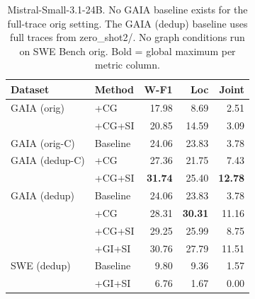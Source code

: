 \begin{table}[h]
\centering\small
\begin{tabular}{ll rrr}
\toprule
\textbf{Dataset} & \textbf{Method} & \textbf{W-F1} & \textbf{Loc} & \textbf{Joint} \\
\midrule
GAIA (orig)   & +CG       & 17.98 &  8.69 &  2.51 \\
              & +CG+SI    & 20.85 & 14.59 &  3.09 \\
\midrule
GAIA (orig-C) & Baseline  & 24.06 & 23.83 &  3.78 \\
\midrule
GAIA (dedup-C)& +CG       & 27.36 & 21.75 &  7.43 \\
              & +CG+SI    & \textbf{31.74} & 25.40 & \textbf{12.78} \\
\midrule
GAIA (dedup)  & Baseline  & 24.06 & 23.83 &  3.78 \\
              & +CG       & 28.31 & \textbf{30.31} & 11.16 \\
              & +CG+SI    & 29.25 & 25.99 &  8.75 \\
              & +GI+SI    & 30.76 & 27.79 & 11.51 \\
\midrule
SWE (dedup)   & Baseline  &  9.80 &  9.36 &  1.57 \\
              & +GI+SI    &  6.76 &  1.67 &  0.00 \\
\bottomrule
\end{tabular}
\caption{Mistral-Small-3.1-24B. No GAIA baseline exists for the full-trace orig setting.
  The GAIA (dedup) baseline uses full traces from zero\_shot2/.
  No graph conditions run on SWE Bench orig.
  Bold = global maximum per metric column.}
\end{table}


